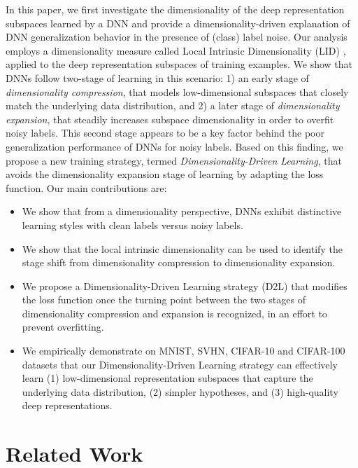 \documentclass{article}
\begin{document}
In this paper, we first investigate the dimensionality of the deep representation subspaces learned by a DNN and provide a dimensionality-driven explanation of DNN generalization behavior in the presence of (class) label noise. Our analysis employs a dimensionality measure called Local Intrinsic Dimensionality (LID) \cite{houle13,houle2017local1}, applied to the deep representation subspaces of training examples. 
We show that DNNs follow two-stage of learning in this scenario: 1) an early stage of {\em dimensionality compression}, that models low-dimensional subspaces that closely match the underlying data distribution, and 2) a later stage of {\em dimensionality expansion}, that steadily increases subspace dimensionality in order to overfit noisy labels. This second stage appears to be a key factor behind the poor generalization performance of DNNs for noisy labels. Based on this finding, we propose a new training strategy, termed {\em Dimensionality-Driven Learning}, 
that avoids the dimensionality expansion stage of learning by adapting the loss function.   Our main contributions are: 

\begin{itemize}
  \item We show that from a dimensionality perspective, DNNs exhibit distinctive learning styles with clean labels versus noisy labels.
  
  \item We show that the local intrinsic dimensionality can be used to identify the stage shift from dimensionality compression to dimensionality expansion.
  
  \item We propose a Dimensionality-Driven Learning strategy (D2L) that modifies the loss function once the turning point between the two stages of dimensionality compression and expansion is recognized, in an effort to prevent overfitting.
  
  \item We empirically demonstrate on MNIST, SVHN, CIFAR-10 and CIFAR-100 datasets that our Dimensionality-Driven Learning strategy can effectively learn (1) low-dimensional representation subspaces that capture the underlying data distribution, (2) simpler hypotheses, and (3) high-quality deep representations.
\end{itemize}

\section{Related Work}
\label{sec:related}
\end{document}
